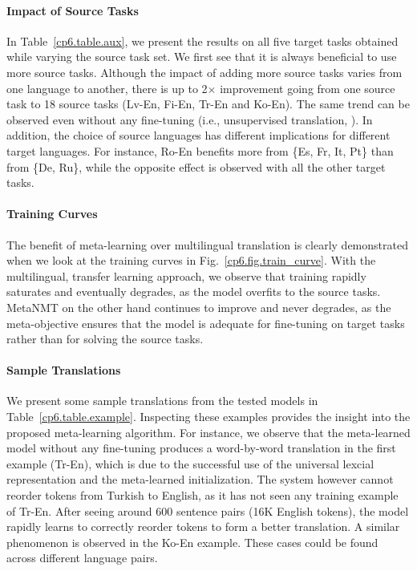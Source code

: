 \paragraph{Impact of Source Tasks}
In Table~\ref{cp6.table.aux}, we present the results on all five target tasks obtained while varying the source task set. We first see that it is always beneficial to use more source tasks. Although the impact of adding more source tasks varies from one language to another, there is up to 2$\times$ improvement going from one source task to 18 source tasks (Lv-En, Fi-En, Tr-En and Ko-En). The same trend can be observed even without any fine-tuning (i.e., unsupervised translation, \citep{lample2017unsupervised,artetxe2017unsupervised}). In addition, the choice of source languages has different implications for different target languages. For instance, Ro-En benefits more from \{Es, Fr, It, Pt\} than from \{De, Ru\}, while the opposite effect is observed with all the other target tasks. 


\paragraph{Training Curves}

The benefit of meta-learning over multilingual translation is clearly demonstrated when we look at the training curves in Fig.~\ref{cp6.fig.train_curve}. With the multilingual, transfer learning approach, we observe that training rapidly saturates and eventually degrades, as the model overfits to the source tasks. MetaNMT on the other hand continues to improve and never degrades, as the meta-objective ensures that the model is adequate for fine-tuning on target tasks rather than for solving the source tasks.

\paragraph{Sample Translations}
We present some sample translations from the tested models in Table~\ref{cp6.table.example}. Inspecting these examples provides the insight into the proposed meta-learning algorithm. For instance, we observe that the meta-learned model without any fine-tuning produces a word-by-word translation in the first example (Tr-En), which is due to the successful use of the universal lexcial representation and the meta-learned initialization. The system however cannot reorder tokens from Turkish to English, as it has not seen any training example of Tr-En. After seeing around 600 sentence pairs (16K English tokens), the model rapidly learns to correctly reorder tokens to form a better translation. A similar phenomenon is observed in the Ko-En example. These cases could be found across different language pairs.  


